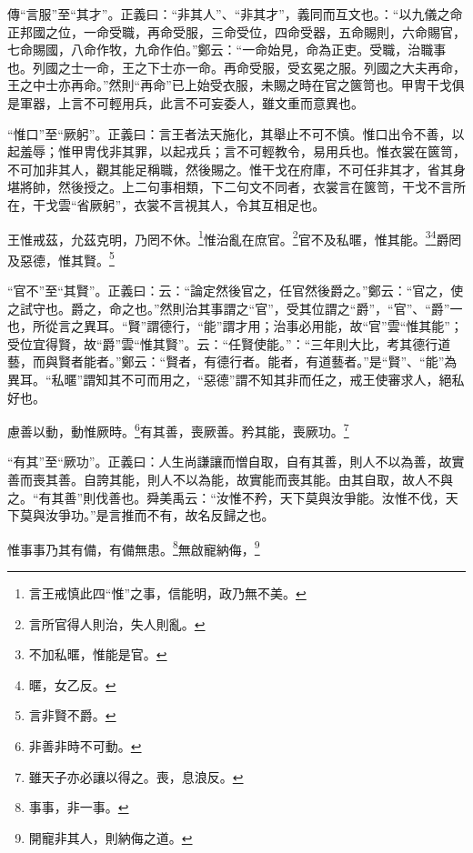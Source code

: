 {\noindent\zhuan{}\fzbyks 傳“言服”至“其才”。正義曰：“非其人”、“非其才”，義同而互文也。：“以九儀之命正邦國之位，一命受職，再命受服，三命受位，四命受器，五命賜則，六命賜官，七命賜國，八命作牧，九命作伯。”鄭云：“一命始見，命為正吏。受職，治職事也。列國之士一命，王之下士亦一命。再命受服，受玄冕之服。列國之大夫再命，王之中士亦再命。”然則“再命”已上始受衣服，未賜之時在官之篋笥也。甲冑干戈俱是軍器，上言不可輕用兵，此言不可妄委人，雖文重而意異也。 \par}

{\noindent\shu{}\fzkt “惟口”至“厥躬”。正義曰：言王者法天施化，其舉止不可不慎。惟口出令不善，以起羞辱；惟甲冑伐非其罪，以起戎兵；言不可輕教令，易用兵也。惟衣裳在篋笥，不可加非其人，觀其能足稱職，然後賜之。惟干戈在府庫，不可任非其才，省其身堪將帥，然後授之。上二句事相類，下二句文不同者，衣裳言在篋笥，干戈不言所在，干戈雲“省厥躬”，衣裳不言視其人，令其互相足也。 \par}

王惟戒茲，允茲克明，乃罔不休。\footnote{言王戒慎此四“惟”之事，信能明，政乃無不美。}惟治亂在庶官。\footnote{言所官得人則治，失人則亂。}官不及私暱，惟其能。\footnote{不加私暱，惟能是官。}\footnote{暱，女乙反。}爵罔及惡德，惟其賢。\footnote{言非賢不爵。}

{\noindent\shu{}\fzkt “官不”至“其賢”。正義曰：云：“論定然後官之，任官然後爵之。”鄭云：“官之，使之試守也。爵之，命之也。”然則治其事謂之“官”，受其位謂之“爵”，“官”、“爵”一也，所從言之異耳。“賢”謂德行，“能”謂才用；治事必用能，故“官”雲“惟其能”；受位宜得賢，故“爵”雲“惟其賢”。云：“任賢使能。”：“三年則大比，考其德行道藝，而與賢者能者。”鄭云：“賢者，有德行者。能者，有道藝者。”是“賢”、“能”為異耳。“私暱”謂知其不可而用之，“惡德”謂不知其非而任之，戒王使審求人，絕私好也。 \par}

慮善以動，動惟厥時。\footnote{非善非時不可動。}有其善，喪厥善。矜其能，喪厥功。\footnote{雖天子亦必讓以得之。喪，息浪反。}

{\noindent\shu{}\fzkt “有其”至“厥功”。正義曰：人生尚謙讓而憎自取，自有其善，則人不以為善，故實善而喪其善。自誇其能，則人不以為能，故實能而喪其能。由其自取，故人不與之。“有其善”則伐善也。舜美禹云：“汝惟不矜，天下莫與汝爭能。汝惟不伐，天下莫與汝爭功。”是言推而不有，故名反歸之也。 \par}

惟事事乃其有備，有備無患。\footnote{事事，非一事。}無啟寵納侮，\footnote{開寵非其人，則納侮之道。}

